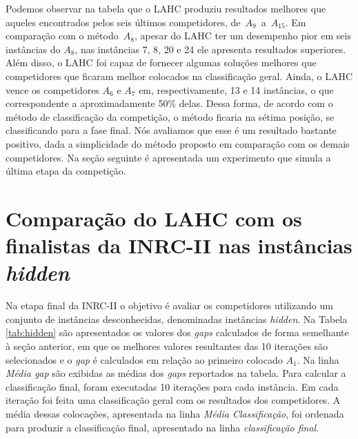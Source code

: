 \documentclass[cic,tc, twoside]{iiufrgs}
\begin{document}
Podemos observar na tabela que o LAHC produziu resultados melhores que aqueles encontrados pelos seis últimos competidores, de~$A_9$~a~$A_{15}$. Em comparação com o método~$A_8$, apesar do LAHC ter um desempenho pior em seis instâncias do $A_8$, nas instâncias 7, 8, 20 e 24 ele apresenta resultados superiores. Além disso, o LAHC foi capaz de fornecer algumas soluções melhores que competidores que ficaram melhor colocados na classificação geral. Ainda, o LAHC vence os competidores $A_6$ e $A_7$ em, respectivamente, 13 e 14 instâncias, o que correspondente a aproximadamente 50\% delas. Dessa forma, de acordo com o método de classificação da competição, o método ficaria na sétima posição, se classificando para a fase final. Nós avaliamos que esse é um resultado bastante positivo, dada a simplicidade do método proposto em comparação com os demais competidores.
Na seção seguinte é apresentada um experimento que simula a última etapa da competição.

\section{Comparação do LAHC com os finalistas da INRC-II nas instâncias \textit{hidden}}

Na etapa final da INRC-II o objetivo é avaliar os competidores utilizando um conjunto de instâncias desconhecidas, denominadas instâncias \textit{hidden}. 
Na Tabela \ref{tab:hidden} são apresentados os valores dos \textit{gaps} calculados de forma semelhante à seção anterior, em que os melhores valores resultantes das 10 iterações são selecionados e o \textit{gap} é calculados em relação ao primeiro colocado $A_1$. 
Na linha \emph{Média gap} são exibidas as médias dos \emph{gaps} reportados na tabela. Para calcular a classificação final, foram executadas 10 iterações para cada instância. Em cada iteração foi feita uma classificação geral com os resultados dos competidores. A média dessas colocações, apresentada na linha \emph{Média Classificação}, foi ordenada para produzir a classificação final, apresentado na linha \emph{classificação final}.
\end{document}
